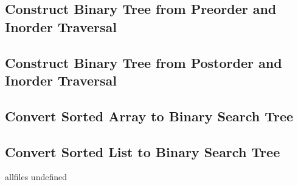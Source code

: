 \documentclass{article}
\begin{document}
\begin{CJK}{UTF8}{gbsn}     %

\else
	
\subsection{Construct Binary Tree from Preorder and Inorder Traversal}

\subsection{Construct Binary Tree from Postorder and Inorder Traversal}

\subsection{Convert Sorted Array to Binary Search Tree}

\subsection{Convert Sorted List to Binary Search Tree}


\fi

\ifx allfiles undefined
\end{CJK}
\end{document}
